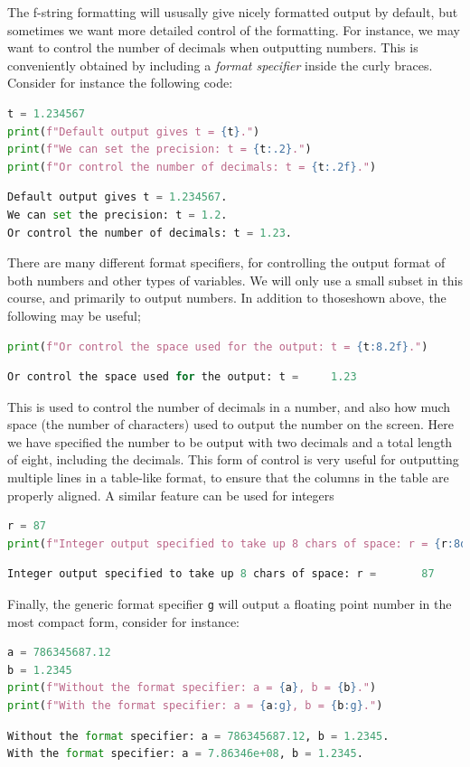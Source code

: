 \documentclass[graybox,envcountchap,sectrefs,final]{svmonodo}
\begin{document}
The f-string formatting will ususally give nicely formatted output by default, but sometimes we want more detailed control
of the formatting. For instance, we may want to control the number of decimals when outputting numbers. This is conveniently obtained
by including a \emph{format specifier} inside the curly braces. Consider for instance the following code:
\begin{lstlisting}[language=Python,style=blue1]
t = 1.234567
print(f"Default output gives t = {t}.")
print(f"We can set the precision: t = {t:.2}.")
print(f"Or control the number of decimals: t = {t:.2f}.")
\end{lstlisting}
\begin{lstlisting}[language=Python,style=gray]
Default output gives t = 1.234567.
We can set the precision: t = 1.2.
Or control the number of decimals: t = 1.23.
\end{lstlisting}
There are many different format specifiers, for controlling the output format of both numbers and other types of variables. We will
only use a small subset in this course, and primarily to output numbers. In addition to thoseshown above, the following
may be useful;
\begin{lstlisting}[language=Python,style=blue1]
print(f"Or control the space used for the output: t = {t:8.2f}.")
\end{lstlisting}
\begin{lstlisting}[language=Python,style=gray]
Or control the space used for the output: t =     1.23
\end{lstlisting}
This is used to control the number of decimals in a number, and also how much space (the number of characters) used to output the number
on the screen. Here we have specified the number to be output with two decimals and a total length of eight, including the decimals.
This form of control is very useful for outputting multiple lines in a table-like format, to ensure that the columns in the table are
properly aligned. A similar feature can be used for integers
\begin{lstlisting}[language=Python,style=blue1]
r = 87
print(f"Integer output specified to take up 8 chars of space: r = {r:8d}")
\end{lstlisting}
\begin{lstlisting}[language=Python,style=gray]
Integer output specified to take up 8 chars of space: r =       87
\end{lstlisting}
Finally, the generic format specifier \texttt{g} will output a floating point number in the most compact form, consider for instance:
\begin{lstlisting}[language=Python,style=blue1]
a = 786345687.12
b = 1.2345
print(f"Without the format specifier: a = {a}, b = {b}.")
print(f"With the format specifier: a = {a:g}, b = {b:g}.")
\end{lstlisting}
\begin{lstlisting}[language=Python,style=gray]
Without the format specifier: a = 786345687.12, b = 1.2345.
With the format specifier: a = 7.86346e+08, b = 1.2345.
\end{lstlisting}
\end{document}
